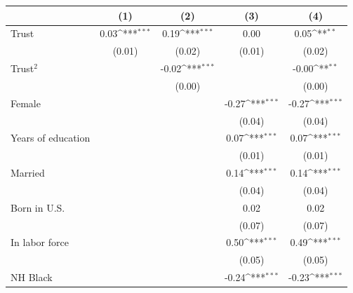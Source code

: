 {
\def\sym#1{\ifmmode^{#1}\else\(^{#1}\)\fi}
\begin{tabular*}{\linewidth}{@{\hskip\tabcolsep\extracolsep\fill}l*{4}{c}}
\toprule
                    &\multicolumn{1}{c}{(1)}&\multicolumn{1}{c}{(2)}&\multicolumn{1}{c}{(3)}&\multicolumn{1}{c}{(4)}\\
\midrule
Trust               &        0.03\sym{***}&        0.19\sym{***}&        0.00         &        0.05\sym{**} \\
                    &      (0.01)         &      (0.02)         &      (0.01)         &      (0.02)         \\
Trust$^2$           &                     &       -0.02\sym{***}&                     &       -0.00\sym{**} \\
                    &                     &      (0.00)         &                     &      (0.00)         \\
Female              &                     &                     &       -0.27\sym{***}&       -0.27\sym{***}\\
                    &                     &                     &      (0.04)         &      (0.04)         \\
Years of education  &                     &                     &        0.07\sym{***}&        0.07\sym{***}\\
                    &                     &                     &      (0.01)         &      (0.01)         \\
Married             &                     &                     &        0.14\sym{***}&        0.14\sym{***}\\
                    &                     &                     &      (0.04)         &      (0.04)         \\
Born in U.S.        &                     &                     &        0.02         &        0.02         \\
                    &                     &                     &      (0.07)         &      (0.07)         \\
In labor force      &                     &                     &        0.50\sym{***}&        0.49\sym{***}\\
                    &                     &                     &      (0.05)         &      (0.05)         \\
NH Black            &                     &                     &       -0.24\sym{***}&       -0.23\sym{***}\\

\end{tabular*}}
